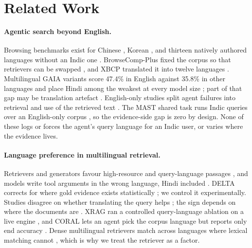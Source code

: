 \section{Related Work}
\label{sec:related}

\paragraph{Agentic search beyond English.} Browsing benchmarks exist for Chinese \citep{a2504_19314}, Korean \citep{a2606_02404,a2606_27595}, and thirteen natively authored languages without an Indic one \citep{a2610_03574}. BrowseComp-Plus fixed the corpus so that retrievers can be swapped \citep{a2508_06600}, and XBCP translated it into twelve languages \citep{a2606_15345}. Multilingual GAIA variants score 47.4\% in English against 35.8\% in other languages and place Hindi among the weakest at every model size \citep{a2505_15935,a2608_08775}; part of that gap may be translation artefact \citep{a2604_24929}. English-only studies split agent failures into retrieval and use of the retrieved text \citep{a2608_01913,a2608_05212,a2609_08094}. The MAST shared task runs Indic queries over an English-only corpus \citep{mast2026}, so the evidence-side gap is zero by design. None of these logs or forces the agent's query language for an Indic user, or varies where the evidence lives.

\paragraph{Language preference in multilingual retrieval.} Retrievers and generators favour high-resource and query-language passages \citep{a2502_11175,a2604_20199,a2605_07249,a2509_13930}, and models write tool arguments in the wrong language, Hindi included \citep{a2601_05366}. DELTA corrects for where gold evidence exists statistically \citep{a2601_02956}; we control it experimentally. Studies disagree on whether translating the query helps \citep{a2504_03616,a2510_23070,a2507_22923}; the sign depends on where the documents are \citep{a2507_07543}. XRAG ran a controlled query-language ablation on a live engine \citep{a2505_10089}, and CORAL lets an agent pick the corpus language but reports only end accuracy \citep{a2604_25676}. Dense multilingual retrievers match across languages where lexical matching cannot \citep{a2511_19324,a2402_03216}, which is why we treat the retriever as a factor.

